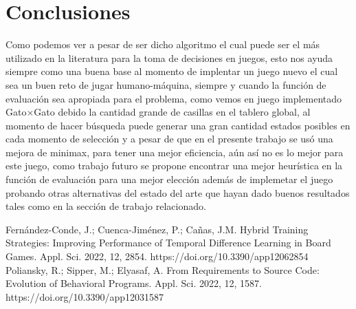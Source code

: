 \documentclass[runningheads]{llncs}
\begin{document}
\section{Conclusiones}
Como podemos ver a pesar de ser dicho algoritmo el cual puede ser el más utilizado en la literatura para la toma de decisiones en juegos, esto nos ayuda siempre como una buena base al momento de implentar un juego nuevo el cual sea un buen reto de jugar humano-máquina, siempre y cuando la función de evaluación sea apropiada para el problema, como vemos en juego implementado Gato$\times$Gato debido la cantidad grande de casillas en el tablero global, al momento de hacer búsqueda puede generar una gran cantidad estados posibles en cada momento de selección y a pesar de que en el presente trabajo se usó una mejora de minimax, para tener una mejor eficiencia, aún así no es lo mejor para este juego, como trabajo futuro se propone encontrar una mejor heurística en la función de evaluación para una mejor elección además de implemetar el juego probando otras alternativas del estado del arte que hayan dado buenos resultados tales como en la sección de trabajo relacionado.
%
%
%
% 
% 
%
\begin{thebibliography}{8}
Fernández-Conde, J.; Cuenca-Jiménez, P.; Cañas, J.M. Hybrid Training Strategies: Improving Performance of Temporal Difference Learning in Board Games. Appl. Sci. 2022, 12, 2854. https://doi.org/10.3390/app12062854
Poliansky, R.; Sipper, M.; Elyasaf, A. From Requirements to Source Code: Evolution of Behavioral Programs. Appl. Sci. 2022, 12, 1587. https://doi.org/10.3390/app12031587

\end{thebibliography}
\end{document}
